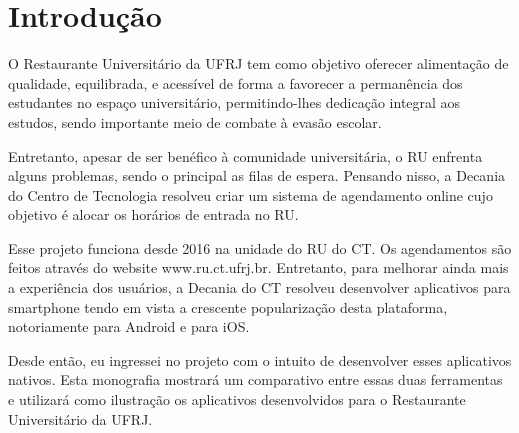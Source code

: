 \chapter{Introdução}

O Restaurante Universitário da UFRJ tem como objetivo oferecer alimentação de qualidade, equilibrada, e 
acessível de forma a favorecer a permanência dos estudantes no espaço universitário, permitindo-lhes 
dedicação integral aos estudos, sendo importante meio de combate à evasão escolar.

Entretanto, apesar de ser benéfico à comunidade universitária, o RU enfrenta alguns problemas, sendo o 
principal as filas de espera. Pensando nisso, a Decania do Centro de Tecnologia resolveu criar um sistema
 de agendamento online cujo objetivo é alocar os horários de entrada no RU.

Esse projeto funciona desde 2016 na unidade do RU do CT. Os agendamentos são feitos através do website
www.ru.ct.ufrj.br. Entretanto, para melhorar ainda mais a experiência dos usuários, a Decania do CT 
resolveu desenvolver aplicativos para smartphone tendo em vista a crescente popularização desta 
plataforma, notoriamente para Android e para iOS.

Desde então, eu ingressei no projeto com o intuito de desenvolver esses aplicativos nativos. Esta 
monografia mostrará um comparativo entre essas duas ferramentas e utilizará como ilustração
os aplicativos desenvolvidos para o Restaurante Universitário da UFRJ.
